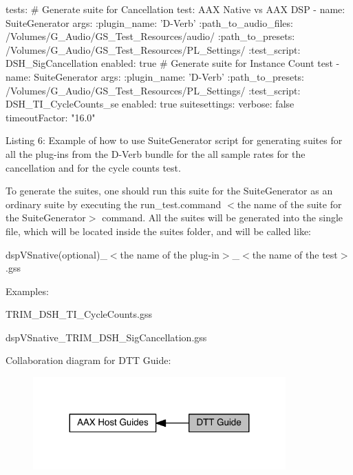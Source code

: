 \begin{DoxyCode}
tests:
\textcolor{preprocessor}{# Generate suite for Cancellation test: AAX Native vs AAX DSP}
- name: SuiteGenerator
  args: 
    :plugin\_name: \textcolor{stringliteral}{'D-Verb'}
    :path\_to\_audio\_files: /Volumes/G\_Audio/GS\_Test\_Resources/audio/
    :path\_to\_presets: /Volumes/G\_Audio/GS\_Test\_Resources/PL\_Settings/
    :test\_script: DSH\_SigCancellation
  enabled: \textcolor{keyword}{true}
\textcolor{preprocessor}{# Generate suite for Instance Count test}
- name: SuiteGenerator
  args: 
    :plugin\_name: \textcolor{stringliteral}{'D-Verb'}
    :path\_to\_presets: /Volumes/G\_Audio/GS\_Test\_Resources/PL\_Settings/
    :test\_script: DSH\_TI\_CycleCounts\_se
  enabled: \textcolor{keyword}{true}
suitesettings: 
  verbose: \textcolor{keyword}{false}
  timeoutFactor: \textcolor{stringliteral}{"16.0"}
\end{DoxyCode}
 Listing 6\+: Example of how to use Suite\+Generator script for generating suites for all the plug-\/ins from the \textquotesingle{}D-\/\+Verb\textquotesingle{} bundle for the all sample rates for the cancellation and for the cycle counts test.

To generate the suites, one should run this suite for the Suite\+Generator as an ordinary suite by executing the {\ttfamily run\+\_\+test.\+command $<$the name of the suite for the Suite\+Generator$>$} command. All the suites will be generated into the single file, which will be located inside the suites folder, and will be called like\+:

{\ttfamily dsp\+V\+Snative(optional)\+\_\+$<$the name of the plug-\/in$>$\+\_\+$<$the name of the test$>$.gss}

Examples\+: 
\begin{DoxyItemize}
\item T\+R\+I\+M\+\_\+\+D\+S\+H\+\_\+\+T\+I\+\_\+\+Cycle\+Counts.\+gss 
\item dsp\+V\+Snative\+\_\+\+T\+R\+I\+M\+\_\+\+D\+S\+H\+\_\+\+Sig\+Cancellation.\+gss 
\end{DoxyItemize}

 Collaboration diagram for D\+T\+T Guide\+:
\nopagebreak
\begin{figure}[H]
\begin{center}
\leavevmode
\includegraphics[width=275pt]{a00366}
\end{center}
\end{figure}
